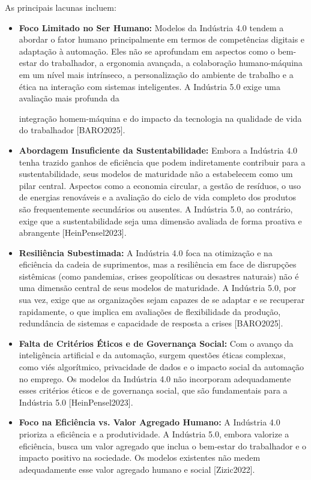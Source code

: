 As principais lacunas incluem:
\begin{itemize}
    \item \textbf{Foco Limitado no Ser Humano:} Modelos da Indústria 4.0 tendem a abordar o fator humano principalmente em termos de competências digitais e adaptação à automação. Eles não se aprofundam em aspectos como o bem-estar do trabalhador, a ergonomia avançada, a colaboração humano-máquina em um nível mais intrínseco, a personalização do ambiente de trabalho e a ética na interação com sistemas inteligentes. A Indústria 5.0 exige uma avaliação mais profunda da 


integração homem-máquina e do impacto da tecnologia na qualidade de vida do trabalhador [BARO2025].
    \item \textbf{Abordagem Insuficiente da Sustentabilidade:} Embora a Indústria 4.0 tenha trazido ganhos de eficiência que podem indiretamente contribuir para a sustentabilidade, seus modelos de maturidade não a estabelecem como um pilar central. Aspectos como a economia circular, a gestão de resíduos, o uso de energias renováveis e a avaliação do ciclo de vida completo dos produtos são frequentemente secundários ou ausentes. A Indústria 5.0, ao contrário, exige que a sustentabilidade seja uma dimensão avaliada de forma proativa e abrangente [HeinPensel2023].
    \item \textbf{Resiliência Subestimada:} A Indústria 4.0 foca na otimização e na eficiência da cadeia de suprimentos, mas a resiliência em face de disrupções sistêmicas (como pandemias, crises geopolíticas ou desastres naturais) não é uma dimensão central de seus modelos de maturidade. A Indústria 5.0, por sua vez, exige que as organizações sejam capazes de se adaptar e se recuperar rapidamente, o que implica em avaliações de flexibilidade da produção, redundância de sistemas e capacidade de resposta a crises [BARO2025].
    \item \textbf{Falta de Critérios Éticos e de Governança Social:} Com o avanço da inteligência artificial e da automação, surgem questões éticas complexas, como viés algorítmico, privacidade de dados e o impacto social da automação no emprego. Os modelos da Indústria 4.0 não incorporam adequadamente esses critérios éticos e de governança social, que são fundamentais para a Indústria 5.0 [HeinPensel2023].
    \item \textbf{Foco na Eficiência vs. Valor Agregado Humano:} A Indústria 4.0 prioriza a eficiência e a produtividade. A Indústria 5.0, embora valorize a eficiência, busca um valor agregado que inclua o bem-estar do trabalhador e o impacto positivo na sociedade. Os modelos existentes não medem adequadamente esse valor agregado humano e social [Zizic2022].
\end{itemize}

